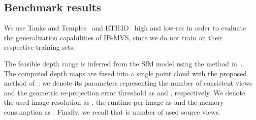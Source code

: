 \documentclass{bmvc2k}
\begin{document}
\subsection{Benchmark results}
We use Tanks and Temples~\cite{tanksandtemples} and ETH3D~\cite{eth3d} high and low-res in order to evaluate the generalization capabilities of IB-MVS, since we do not train on their respective training sets.

The feasible depth range  is inferred from the SfM model using the method in~\cite{mvsnet}.
The computed depth maps are fused into a single point cloud with the proposed method of~\cite{mvsnet}; we denote its parameters representing the number of consistent views and the geometric re-projection error threshold as  and , respectively. 
We denote the used image resolution as , the runtime per image as  and the memory consumption as .
Finally, we recall that  is number of used source views.
\end{document}
